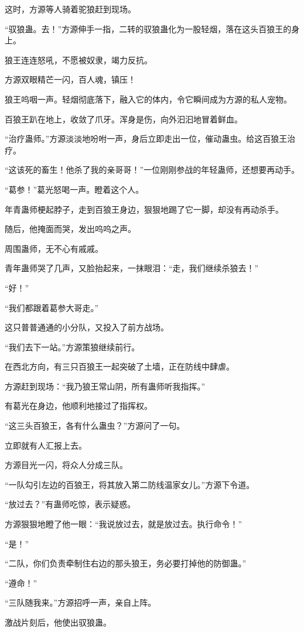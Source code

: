 \begin{this_body}
这时，方源等人骑着驼狼赶到现场。

“驭狼蛊。去！”方源伸手一指，二转的驭狼蛊化为一股轻烟，落在这头百狼王的身上。

狼王连连怒吼，不愿被奴隶，竭力反抗。

方源双眼精芒一闪，百人魂，镇压！

狼王呜咽一声。轻烟彻底落下，融入它的体内，令它瞬间成为方源的私人宠物。

百狼王趴在地上，收敛了爪牙。浑身是伤，向外汩汩地冒着鲜血。

“治疗蛊师。”方源淡淡地吩咐一声，身后立即走出一位，催动蛊虫。给这百狼王治疗。

“这该死的畜生！他杀了我的亲哥哥！”一位刚刚参战的年轻蛊师，还想要再动手。

“葛参！”葛光怒喝一声。瞪着这个人。

年青蛊师梗起脖子，走到百狼王身边，狠狠地踢了它一脚，却没有再动杀手。

随后，他掩面而哭，发出呜呜之声。

周围蛊师，无不心有戚戚。

青年蛊师哭了几声，又脸抬起来，一抹眼泪：“走，我们继续杀狼去！”

“好！”

“我们都跟着葛参大哥走。”

这只普普通通的小分队，又投入了前方战场。

“我们去下一站。”方源策狼继续前行。

在西北方向，有三只百狼王一起突破了土墙，正在防线中肆虐。

方源赶到现场：“我乃狼王常山阴，所有蛊师听我指挥。”

有葛光在身边，他顺利地接过了指挥权。

“这三头百狼王，各有什么蛊虫？”方源问了一句。

立即就有人汇报上去。

方源目光一闪，将众人分成三队。

“一队勾引左边的百狼王，将其放入第二防线温家女儿。”方源下令道。

“放过去？”有蛊师吃惊，表示疑惑。

方源狠狠地瞪了他一眼：“我说放过去，就是放过去。执行命令！”

“是！”

“二队，你们负责牵制住右边的那头狼王，务必要打掉他的防御蛊。”

“遵命！”

“三队随我来。”方源招呼一声，亲自上阵。

激战片刻后，他使出驭狼蛊。


\end{this_body}
